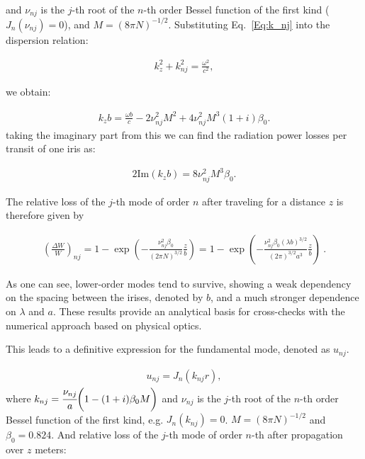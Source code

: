     and $\nu_{nj}$ is the $j$-th root of the $n$-th order Bessel
    function of the first kind ($J_n(\nu_{nj}) = 0$), and $M = (8 \pi N)^{-1/2}$. Substituting Eq.~\ref{Eq:k_nj} into the dispersion relation:
    
    \begin{eqnarray}
        k_z^2 + k_{nj}^2 = \frac{\omega^2}{c^2},
        \label{kzzz}
    \end{eqnarray}

    we obtain:
    
    \begin{eqnarray}
        k_z b = \frac{\omega b}{c} - 2 \nu_{nj}^2 M^2 + 4 \nu_{nj}^2 M^3
        (1+i)\beta_0. 
        \label{kzzz2}
    \end{eqnarray}
    taking the imaginary part from this we can find the radiation power losses per transit of one iris as:
    
    \begin{eqnarray}
        2 \mathrm{Im}(k_z b) = 8 \nu_{nj}^2 M^3 \beta_0. 
        \label{loss}
    \end{eqnarray}
    
    The relative loss of the $j$-th mode of order $n$ after traveling
    for a distance $z$ is therefore given by
    
    \begin{eqnarray}
    \left(\frac{\Delta W}{W}\right)_{nj} = 1- \exp\left(-\frac{
    \nu_{nj}^2\beta_0  }{ (2\pi N)^{3/2}}\frac{z}{b}\right) = 1-
    \exp\left(-\frac{ \nu_{nj}^2\beta_0 (\lambda b)^{3/2} }{
    (2\pi)^{3/2} a^3}\frac{z}{b}\right)~.\label{loss}
    \end{eqnarray}
    
    As one can see, lower-order modes tend to survive, showing a weak dependency on the spacing between the irises, denoted by $b$, and a much stronger dependence on $\lambda$ and $a$. These results provide an analytical basis for cross-checks with the numerical approach based on physical optics.
    
    
    This leads to a definitive expression for the fundamental mode, denoted as $u_{nj}$.
    
    \begin{align}
        u_{nj} = J_n(k_{nj} r),
        \label{Eq:mode_shape}
    \end{align}
    where $k_{nj} = \cfrac{\nu_{nj}}{a} \bigg(1 - (1 + i)\beta_0 M \bigg)$ and $\nu_{nj}$ is the $j$-th root of the $n$-th order Bessel function of the first kind, e.g. $J_n(k_{nj}) = 0$. $M = (8 \pi N)^{-1/2}$ and $\beta_0 = 0.824$. And relative loss of the $j$-th mode of order $n$-th after propagation over $z$ meters:
    

